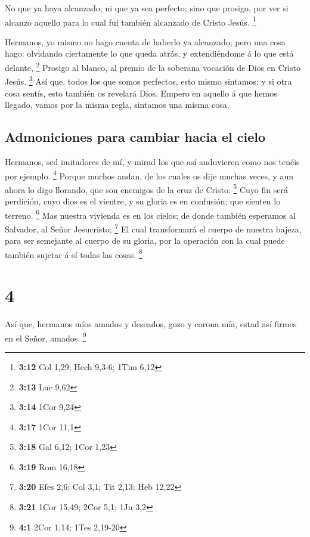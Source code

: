  No que ya haya alcanzado, ni que ya sea perfecto; sino
que prosigo, por ver si alcanzo aquello para lo cual fuí también
alcanzado de Cristo Jesús. \footnote{\textbf{3:12} Col 1,29; Hech 9,3-6;
  1Tim 6,12}

 Hermanos, yo mismo no hago cuenta de haberlo ya
alcanzado; pero una cosa hago: olvidando ciertamente lo que queda atrás,
y extendiéndome á lo que está delante, \footnote{\textbf{3:13} Luc 9,62}
 Prosigo al blanco, al premio de la soberana vocación de
Dios en Cristo Jesús. \footnote{\textbf{3:14} 1Cor 9,24} 
Así que, todos los que somos perfectos, esto mismo sintamos: y si otra
cosa sentís, esto también os revelará Dios.  Empero en
aquello á que hemos llegado, vamos por la misma regla, sintamos una
misma cosa.

\hypertarget{admoniciones-para-cambiar-hacia-el-cielo}{%
\subsection{Admoniciones para cambiar hacia el
cielo}\label{admoniciones-para-cambiar-hacia-el-cielo}}

 Hermanos, sed imitadores de mí, y mirad los que así
anduvieren como nos tenéis por ejemplo. \footnote{\textbf{3:17} 1Cor
  11,1}  Porque muchos andan, de los cuales os dije
muchas veces, y aun ahora lo digo llorando, que son enemigos de la cruz
de Cristo: \footnote{\textbf{3:18} Gal 6,12; 1Cor 1,23} 
Cuyo fin será perdición, cuyo dios es el vientre, y su gloria es en
confusión; que sienten lo terreno. \footnote{\textbf{3:19} Rom 16,18}
 Mas nuestra vivienda es en los cielos; de donde también
esperamos al Salvador, al Señor Jesucristo; \footnote{\textbf{3:20} Efes
  2,6; Col 3,1; Tit 2,13; Heb 12,22}  El cual
transformará el cuerpo de nuestra bajeza, para ser semejante al cuerpo
de su gloria, por la operación con la cual puede también sujetar á sí
todas las cosas. \footnote{\textbf{3:21} 1Cor 15,49; 2Cor 5,1; 1Jn 3,2}

\hypertarget{section-3}{%
\section{4}\label{section-3}}

 Así que, hermanos míos amados y deseados, gozo y corona
mía, estad así firmes en el Señor, amados. \footnote{\textbf{4:1} 2Cor
  1,14; 1Tes 2,19-20}

